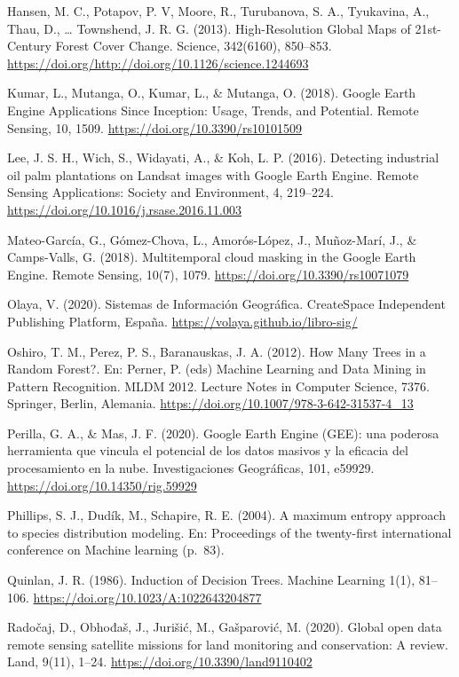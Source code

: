 \documentclass[
  12pt,
  letterpaper,
  twoside]{book}
\begin{document}
Hansen, M. C., Potapov, P. V, Moore, R., Turubanova, S. A., Tyukavina, A., Thau, D., \ldots{} Townshend, J. R. G. (2013). High-Resolution Global Maps of 21st-Century Forest Cover Change. Science, 342(6160), 850--853. \url{https://doi.org/http://doi.org/10.1126/science.1244693}

Kumar, L., Mutanga, O., Kumar, L., \& Mutanga, O. (2018). Google Earth Engine Applications Since Inception: Usage, Trends, and Potential. Remote Sensing, 10, 1509. \url{https://doi.org/10.3390/rs10101509}

Lee, J. S. H., Wich, S., Widayati, A., \& Koh, L. P. (2016). Detecting industrial oil palm plantations on Landsat images with Google Earth Engine. Remote Sensing Applications: Society and Environment, 4, 219--224. \url{https://doi.org/10.1016/j.rsase.2016.11.003}

Mateo-García, G., Gómez-Chova, L., Amorós-López, J., Muñoz-Marí, J., \& Camps-Valls, G. (2018). Multitemporal cloud masking in the Google Earth Engine. Remote Sensing, 10(7), 1079. \url{https://doi.org/10.3390/rs10071079}

Olaya, V. (2020). Sistemas de Información Geográfica. CreateSpace Independent Publishing Platform, España. \url{https://volaya.github.io/libro-sig/}

Oshiro, T. M., Perez, P. S., Baranauskas, J. A. (2012). How Many Trees in a Random Forest?. En: Perner, P. (eds) Machine Learning and Data Mining in Pattern Recognition. MLDM 2012. Lecture Notes in Computer Science, 7376. Springer, Berlin, Alemania. \url{https://doi.org/10.1007/978-3-642-31537-4_13}

Perilla, G. A., \& Mas, J. F. (2020). Google Earth Engine (GEE): una poderosa herramienta que vincula el potencial de los datos masivos y la eficacia del procesamiento en la nube. Investigaciones Geográficas, 101, e59929. \url{https://doi.org/10.14350/rig.59929}

Phillips, S. J., Dudík, M., Schapire, R. E. (2004). A maximum entropy approach to species distribution modeling. En: Proceedings of the twenty-first international conference on Machine learning (p.~83).

Quinlan, J. R. (1986). Induction of Decision Trees. Machine Learning 1(1), 81--106. \url{https://doi.org/10.1023/A:1022643204877}

Radočaj, D., Obhođaš, J., Jurišić, M., Gašparović, M. (2020). Global open data remote sensing satellite missions for land monitoring and conservation: A review. Land, 9(11), 1--24. \url{https://doi.org/10.3390/land9110402}
\end{document}
